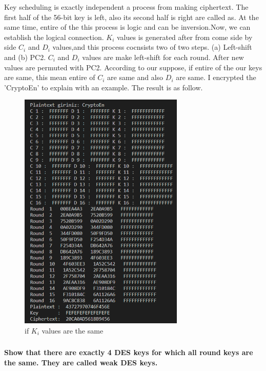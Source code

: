\documentclass[11pt]{article}
\begin{document}
Key scheduling is exactly independent a process from making ciphertext. The first half of the 56-bit key is left, also its second half 
is right are called as. At the same time, entire of the this process is logic and can be inversion.Now, we can establish the logical connection. 
$K_{i}$ values is generated after from come side by side $C_{i}$  and $D_{i}$ values,and this process cocnsists two of two steps.
(a) Left-shift and (b) PC2. $C_{i}$  and $D_{i}$ values are make left-shift for each round. After new values are permuted with PC2. According to our suppose,
if entire of the our keys are same, this mean entire of  $C_{i}$ are same and also $D_{i}$ are same. I encrypted the 'CryptoEn' to explain with an example.
The result is as follow.\\
\begin{figure}[!h]
  \centering
  \includegraphics[width=0.7\textwidth]{Screenshot_3.png}
  \caption{if $K_{i}$ values are the same }
  \label{fig:boat1}
\end{figure}

\newpage
\subsubsection{}\textbf{Show that there are exactly 4 DES keys for which all round keys are the same. They are
called weak DES keys.}\\
\end{document}
